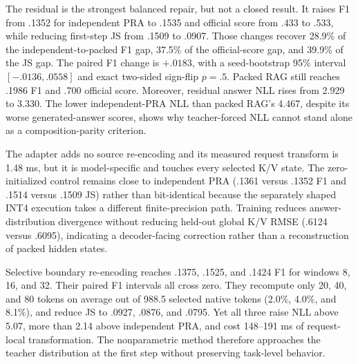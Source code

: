 \documentclass[11pt]{article}
\begin{document}
\begin{table}[ht]
\centering
\caption{Held-out cross-document repair on 30 MultiHop-RAG questions in five
seed cohorts. ``Official'' is the dataset's answer-containment score. JS is
first-step divergence from packed RAG; re-encoding counts request-local source
tokens. Lower NLL and JS are better.}
\label{tab:crossdoc-adapter}
\small
\resizebox{\linewidth}{!}{}
\end{table}

The residual is the strongest balanced repair, but not a closed result. It
raises F1 from .1352 for independent PRA to .1535 and official score from .433
to .533, while reducing first-step JS from .1509 to .0907. Those changes recover
28.9\% of the independent-to-packed F1 gap, 37.5\% of the official-score gap,
and 39.9\% of the JS gap. The paired F1 change is $+.0183$, with a seed-bootstrap
95\% interval $[-.0136,.0558]$ and exact two-sided sign-flip $p=.5$. Packed RAG
still reaches .1986 F1 and .700 official score. Moreover, residual answer NLL
rises from 2.929 to 3.330. The lower independent-PRA NLL than packed RAG's
4.467, despite its worse generated-answer scores, shows why teacher-forced NLL
cannot stand alone as a composition-parity criterion.

The adapter adds no source re-encoding and its measured request transform is
1.48 ms, but it is model-specific and touches every selected K/V state. The
zero-initialized control remains close to independent PRA (.1361 versus .1352
F1 and .1514 versus .1509 JS) rather than bit-identical because the separately
shaped INT4 execution takes a different finite-precision path. Training reduces
answer-distribution divergence without reducing held-out global K/V RMSE
(.6124 versus .6095), indicating a decoder-facing correction rather than a
reconstruction of packed hidden states.

Selective boundary re-encoding reaches .1375, .1525, and .1424 F1 for windows
8, 16, and 32. Their paired F1 intervals all cross zero. They recompute only
20, 40, and 80 tokens on average out of 988.5 selected native tokens
(2.0\%, 4.0\%, and 8.1\%), and reduce JS to .0927, .0876, and .0795. Yet all
three raise NLL above 5.07, more than 2.14 above independent PRA, and cost
148--191 ms of request-local transformation. The nonparametric method therefore
approaches the teacher distribution at the first step without preserving
task-level behavior.
\end{document}
